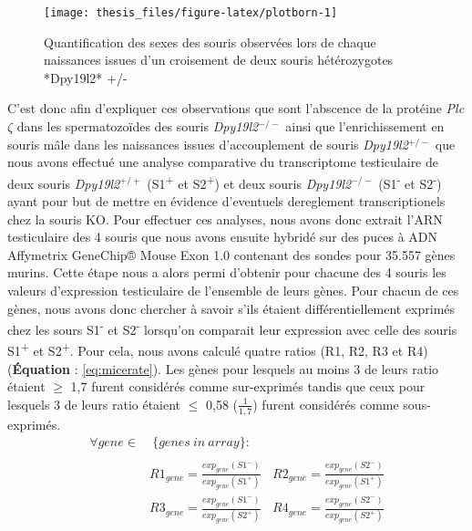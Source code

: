 \documentclass[12pt,twoside]{reedthesis}
\theoremstyle{definition}
\theoremstyle{definition}
\theoremstyle{remark}
\begin{document}
  \begin{figure}
  
  {\centering \texttt{[image: thesis\_files/figure-latex/plotborn-1]} 
  
  }
  
  \caption[Quantification des sexes des souris observées lors de chaque naissances issues d'un croisement de deux souris hétérozygotes *Dpy19l2* +/-]{Quantification des sexes des souris observées lors de chaque naissances issues d'un croisement de deux souris hétérozygotes *Dpy19l2* +/-}\label{fig:plotborn}
  \end{figure}
  
  \newpage
  
  C'est donc afin d'expliquer ces observations que sont l'abscence de la
  protéine \emph{Plc}\(\zeta\) dans les spermatozoïdes des souris
  \emph{Dpy19l2}\(^{-/-}\) ainsi que l'enrichissement en souris mâle dans
  les naissances issues d'accouplement de souris \emph{Dpy19l2}\(^{+/-}\)
  que nous avons effectué une analyse comparative du transcriptome
  testiculaire de deux souris \emph{Dpy19l2}\(^{+/+}\)
  (S1\textsuperscript{+} et S2\textsuperscript{+}) et deux souris
  \emph{Dpy19l2}\(^{-/-}\) (S1\textsuperscript{-} et
  S2\textsuperscript{-}) ayant pour but de mettre en évidence d'eventuels
  dereglement transcriptionels chez la souris KO. Pour effectuer ces
  analyses, nous avons donc extrait l'ARN testiculaire des 4 souris que
  nous avons ensuite hybridé sur des puces à ADN Affymetrix GeneChip®
  Mouse Exon 1.0 contenant des sondes pour 35.557 gènes murins. Cette
  étape nous a alors permi d'obtenir pour chacune des 4 souris les valeurs
  d'expression testiculaire de l'ensemble de leurs gènes. Pour chacun de
  ces gènes, nous avons donc chercher à savoir s'ils étaient
  différentiellement exprimés chez les sours S1\textsuperscript{-} et
  S2\textsuperscript{-} lorsqu'on comparait leur expression avec celle des
  souris S1\textsuperscript{+} et S2\textsuperscript{+}. Pour cela, nous
  avons calculé quatre ratios (R1, R2, R3 et R4) (\textbf{Équation} :
  \eqref{eq:micerate}). Les gènes pour lesquels au moins 3 de leurs ratio
  étaient \(\ge\) 1,7 furent considérés comme sur-exprimés tandis que ceux
  pour lesquels 3 de leurs ratio étaient \(\le\) 0,58 (\(\frac{1}{1,7}\))
  furent considérés comme sous-exprimés.\\
  
  \begin{equation} 
  \begin{split}
  \forall gene \in & \ \{genes\ in\ array\}: \\
  \\
  & R1_{gene} = \frac{exp_{gene}(S1^-)}{exp_{gene}(S1^+)} \ \ \ \ R2_{gene} = \frac{exp_{gene}(S2^-)}{exp_{gene}(S1^+)} \\
  & R3_{gene} = \frac{exp_{gene}(S1^-)}{exp_{gene}(S2^+)} \ \ \ \ R4_{gene} = \frac{exp_{gene}(S2^-)}{exp_{gene}(S2^+)} 
  \label{eq:micerate}
  \end{split}
  \end{equation}
  
\end{document}
